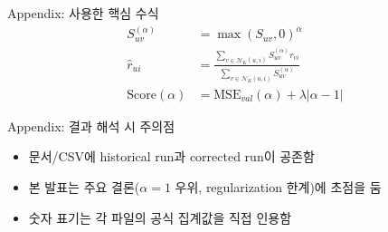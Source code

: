 \documentclass[aspectratio=169,10pt]{beamer}
\begin{document}
\begin{frame}{Appendix: 사용한 핵심 수식}
	\begin{align*}
		S_{uv}^{(\alpha)} &= \max(S_{uv},0)^{\alpha}\\[4pt]
		\hat{r}_{ui} &= \frac{\sum_{v\in\mathcal{N}_K(u,i)} S_{uv}^{(\alpha)}r_{vi}}
												 {\sum_{v\in\mathcal{N}_K(u,i)} S_{uv}^{(\alpha)}}\\[4pt]
		\text{Score}(\alpha) &= \text{MSE}_{val}(\alpha) + \lambda|\alpha-1|
	\end{align*}
\end{frame}

\begin{frame}[shrink=5]{Appendix: 결과 해석 시 주의점}
	\begin{itemize}
		\item 문서/CSV에 historical run과 corrected run이 공존함
		\item 본 발표는 주요 결론(\(\alpha=1\) 우위, regularization 한계)에 초점을 둠
		\item 숫자 표기는 각 파일의 공식 집계값을 직접 인용함
	\end{itemize}
\end{frame}
\end{document}
